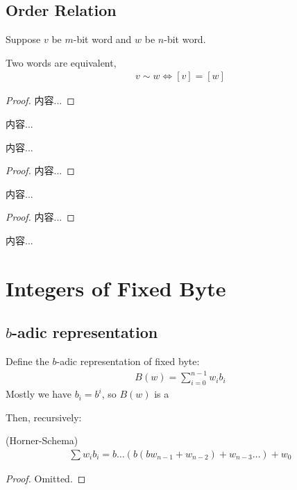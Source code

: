 \documentclass[Total.tex]{subfiles}
\begin{document}
			\subsection{Order Relation}
				\begin{Def}
					Suppose $v$ be $m$-bit word and $w$ be $n$-bit word.
				\end{Def}
				
				\begin{corollary}
					Two words are equivalent, 
					\begin{gather*}
						v\sim w\Leftrightarrow [v]=[w]
					\end{gather*}
				\end{corollary}
				\begin{proof}
					内容...
				\end{proof}
				
				\begin{Def}
					内容...
				\end{Def}
				\begin{proposition}
					内容...
				\end{proposition}
				\begin{proof}
					内容...
				\end{proof}
				
				\begin{proposition}
					内容...
				\end{proposition}
				\begin{proof}
					内容...
				\end{proof}
				
				\begin{Def}
					内容...
				\end{Def}
		\section{Integers of Fixed Byte}
			\subsection{$b$-adic representation}
			\begin{Def}
				Define the $b$-adic representation of fixed byte:
				\begin{gather*}
					B(w)=\sum_{i=0}^{n-1} w_i b_i
				\end{gather*}
				Mostly we have $b_i=b^i$, so $B(w)$ is a 
			\end{Def}
			Then, recursively:
			
			\begin{proposition}
				(Horner-Schema) 
				\begin{gather*}
					\sum w_i b_i=b\dots(b(bw_{n-1}+w_{n-2})+w_{n-3}\dots)+w_0
				\end{gather*}
			\end{proposition}
			\begin{proof}
				Omitted.
			\end{proof}
			
\end{document}
